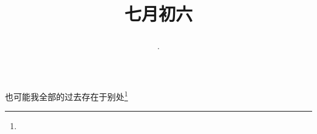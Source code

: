 \title{\date[d=9,m=8,y=2024][year:cn-y,年,month:cn,day:cn,日,·,weekday]·七月初六 }
也可能我全部的过去存在于别处\footnote{ }

